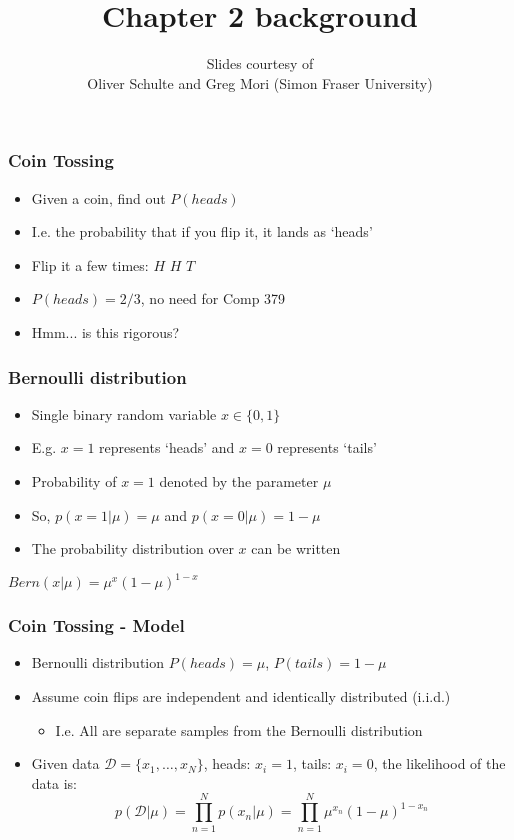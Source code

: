\documentclass{beamer}
\title{Chapter 2 background}
\subtitle{Slides courtesy of \\Oliver Schulte and Greg Mori (Simon Fraser University)}
\begin{document}
\maketitle

\begin{frame}
  \frametitle{Coin Tossing}
  \begin{itemize}
  \item Given a coin, find out $P(heads)$
  \item I.e. the probability that if you flip it, it lands as `heads' \pause
  \item Flip it a few times: $H$ $H$ $T$
  \item $P(heads)=2/3$, no need for Comp 379
  \item Hmm... is this rigorous?
  \end{itemize}
\end{frame}

\begin{frame}
  \frametitle{Bernoulli distribution}
  \begin{itemize}
  \item Single binary random variable $x\in\{0,1\}$
  \item E.g. $x=1$ represents `heads' and $x=0$ represents `tails'
  \item Probability of $x=1$ denoted by the parameter $\mu$
  \item So, $p(x=1|\mu) = \mu$ and $p(x=0|\mu) = 1 - \mu$
  \item The probability distribution over $x$ can be written
  \end{itemize}
  \centering
  $Bern(x|\mu) = \mu^x(1-\mu)^{1-x}$
\end{frame}

\begin{frame}
  \frametitle{Coin Tossing - Model}
  \begin{itemize}
  \item Bernoulli distribution $P(heads) = \mu$, $P(tails) = 1 - \mu$
  \item Assume coin flips are independent and identically distributed (i.i.d.)
    \begin{itemize}
    \item I.e. All are separate samples from the Bernoulli distribution
    \end{itemize}
  \item Given data $\mathcal{D} = \{x_1,\ldots,x_N\}$, heads: $x_i=1$, tails: $x_i=0$, the likelihood of the data is: \[p(\mathcal{D}|\mu) = \prod_{n=1}^{N} p(x_n|\mu) = \prod_{n=1}^{N} \mu^{x_n} (1-\mu)^{1-x_n} \]
  \end{itemize}
\end{frame}
\end{document}
